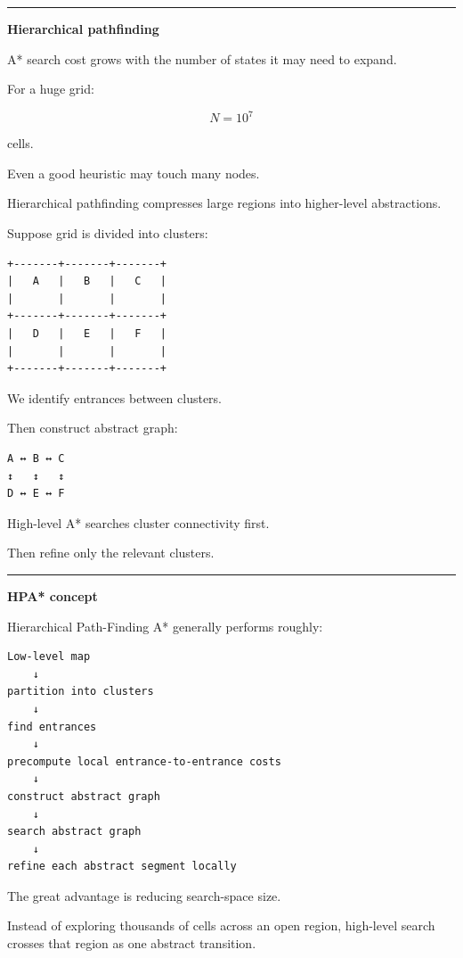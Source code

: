 \begin{center}\rule{0.5\linewidth}{0.5pt}\end{center}

\textbf{Hierarchical pathfinding}

A* search cost grows with the number of states it may need to expand.

For a huge grid:

\[
N=10^7
\]

cells.

Even a good heuristic may touch many nodes.

Hierarchical pathfinding compresses large regions into higher-level abstractions.

Suppose grid is divided into clusters:

\begin{verbatim}
+-------+-------+-------+
|   A   |   B   |   C   |
|       |       |       |
+-------+-------+-------+
|   D   |   E   |   F   |
|       |       |       |
+-------+-------+-------+
\end{verbatim}

We identify entrances between clusters.

Then construct abstract graph:

\begin{verbatim}
A ↔ B ↔ C
↕   ↕   ↕
D ↔ E ↔ F
\end{verbatim}

High-level A* searches cluster connectivity first.

Then refine only the relevant clusters.

\begin{center}\rule{0.5\linewidth}{0.5pt}\end{center}

\textbf{HPA* concept}

Hierarchical Path-Finding A* generally performs roughly:

\begin{verbatim}
Low-level map
    ↓
partition into clusters
    ↓
find entrances
    ↓
precompute local entrance-to-entrance costs
    ↓
construct abstract graph
    ↓
search abstract graph
    ↓
refine each abstract segment locally
\end{verbatim}

The great advantage is reducing search-space size.

Instead of exploring thousands of cells across an open region, high-level search crosses that region as one abstract transition.

